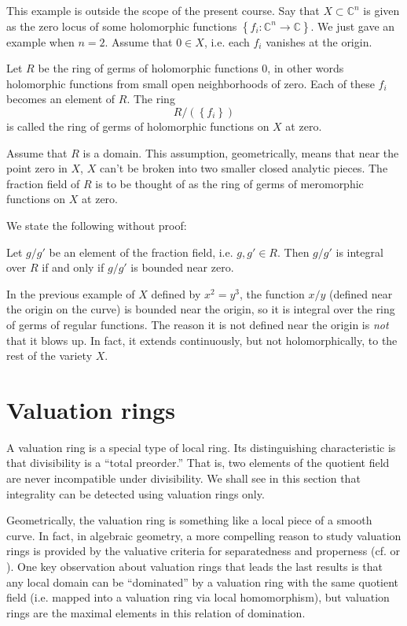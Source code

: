 \begin{example}
This example is outside the scope of the present course.  Say that $X \subset
\mathbb{C}^n$ is given as the zero locus of some holomorphic functions
$\left\{f_i: \mathbb{C}^{n} \to \mathbb{C}\right\}$.  We just gave an example
when $n=2$.
Assume that $0 \in X$, i.e. each $f_i$ vanishes at the origin.  

Let $R$ be the ring of germs of holomorphic functions $0$, in other words
holomorphic functions from small open neighborhoods of zero.  Each of these
$f_i$ becomes an  element of $R$.  The ring
\[ R/(\left\{f_i\right\} ) \]
is called the ring of germs of holomorphic functions on $X$ at zero. 

Assume that $R$ is a domain.  This assumption, geometrically, means that near
the point zero in $X$, $X$ can't be broken into two smaller closed analytic
pieces.  The fraction field of $R$ is to be thought of as the ring of
germs of meromorphic functions on $X$ at zero.

We state the following without proof:

\begin{theorem} 
Let $g/g'$ be an element of the fraction field, i.e. $g, g' \in R$. Then $g/g'$
is integral over $R$ if and only if $g/g'$ is bounded near zero. 
\end{theorem} 

In the previous example of $X$ defined by $x^2 = y^3$, the function $x/y$
(defined near the origin on the curve) is
bounded near the origin, so it is integral over the ring of germs of regular
functions. The reason it is not defined near the origin is \emph{not} that it
blows up. In fact, it extends continuously, but not holomorphically, to the
rest of the variety $X$. 
\end{example} 





\section{Valuation rings}

A valuation ring is a special type of local ring. Its distinguishing
characteristic is that divisibility is a ``total preorder.'' That is, two
elements of the quotient field are never incompatible under divisibility.
 We shall see in this section that integrality can be detected using
valuation rings only.

Geometrically, the valuation ring is something like a local piece of a smooth
curve. In fact, in algebraic geometry, a more compelling reason to study
valuation rings is provided by the valuative criteria for separatedness and
properness (cf. \cite{EGA} or \cite{Ha77}).  One key observation about
valuation rings that leads the last results is that any local domain can be
``dominated'' by a valuation ring with the same quotient field (i.e. mapped into a valuation ring via local
homomorphism), but valuation rings are the maximal elements in this relation
of domination.


